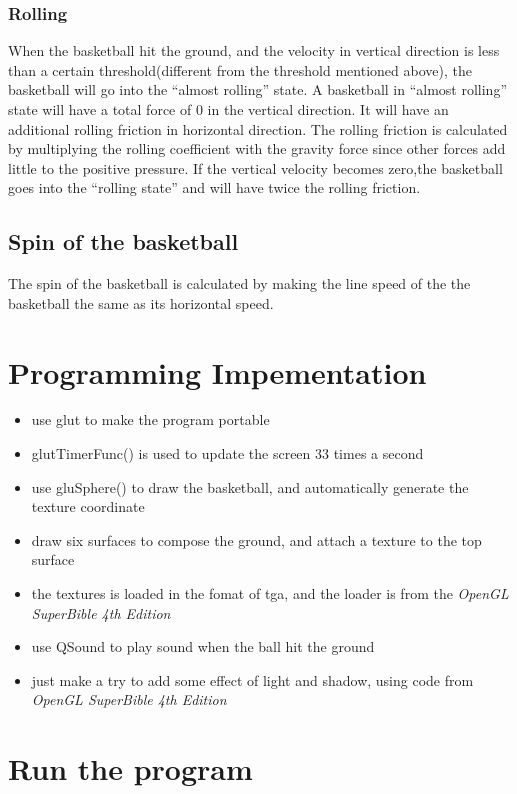 \documentclass[10pt,a4paper]{article}
\begin{document}
\subsubsection{Rolling}
When the basketball hit the ground, and the velocity in vertical direction is less than a certain threshold(different from the threshold mentioned above), the basketball will go into the ``almost rolling'' state. A basketball in ``almost rolling'' state will have a total force of 0 in the vertical direction. It will have an additional rolling friction in horizontal direction. The rolling friction is calculated by multiplying the rolling coefficient with the gravity force since other forces add little to the positive pressure. If the vertical velocity becomes zero,the basketball goes into the ``rolling state'' and will have twice the rolling friction.

\subsection{Spin of the basketball}
The spin of the basketball is calculated by making the line speed of the the basketball the same as its horizontal speed. 

\section{Programming Impementation}
\begin{itemize}
\item use glut to make the program portable
\item glutTimerFunc() is used to update the screen 33 times a second
\item use gluSphere() to draw the basketball, and automatically generate the texture coordinate
\item draw six surfaces to compose the ground, and attach a texture to the top surface
\item the textures is loaded in the fomat of tga, and the loader is from the \textsl{OpenGL SuperBible 4th Edition}
\item use QSound to play sound when the ball hit the ground
\item just make a try to add some effect of light and shadow, using code from \textsl{OpenGL SuperBible 4th Edition}
\end{itemize}

\section{Run the program}
\end{document}
